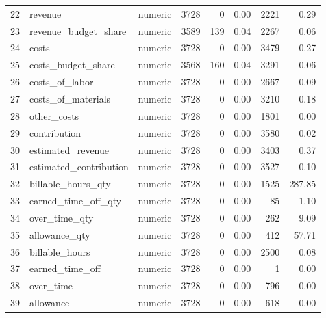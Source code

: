 \begin{sidewaystable}[ht]
\begin{tabular}{rllrrrrr}
  22 & revenue & numeric & 3728 &   0 & 0.00 & 2221 & 0.29 \\ 
  23 & revenue\_budget\_share & numeric & 3589 & 139 & 0.04 & 2267 & 0.06 \\ 
  24 & costs & numeric & 3728 &   0 & 0.00 & 3479 & 0.27 \\ 
  25 & costs\_budget\_share & numeric & 3568 & 160 & 0.04 & 3291 & 0.06 \\ 
  26 & costs\_of\_labor & numeric & 3728 &   0 & 0.00 & 2667 & 0.09 \\ 
  27 & costs\_of\_materials & numeric & 3728 &   0 & 0.00 & 3210 & 0.18 \\ 
  28 & other\_costs & numeric & 3728 &   0 & 0.00 & 1801 & 0.00 \\ 
  29 & contribution & numeric & 3728 &   0 & 0.00 & 3580 & 0.02 \\ 
  30 & estimated\_revenue & numeric & 3728 &   0 & 0.00 & 3403 & 0.37 \\ 
  31 & estimated\_contribution & numeric & 3728 &   0 & 0.00 & 3527 & 0.10 \\ 
  32 & billable\_hours\_qty & numeric & 3728 &   0 & 0.00 & 1525 & 287.85 \\ 
  33 & earned\_time\_off\_qty & numeric & 3728 &   0 & 0.00 &  85 & 1.10 \\ 
  34 & over\_time\_qty & numeric & 3728 &   0 & 0.00 & 262 & 9.09 \\ 
  35 & allowance\_qty & numeric & 3728 &   0 & 0.00 & 412 & 57.71 \\ 
  36 & billable\_hours & numeric & 3728 &   0 & 0.00 & 2500 & 0.08 \\ 
  37 & earned\_time\_off & numeric & 3728 &   0 & 0.00 &   1 & 0.00 \\ 
  38 & over\_time & numeric & 3728 &   0 & 0.00 & 796 & 0.00 \\ 
  39 & allowance & numeric & 3728 &   0 & 0.00 & 618 & 0.00 \\ 
   \hline
\end{tabular}
\end{sidewaystable}
